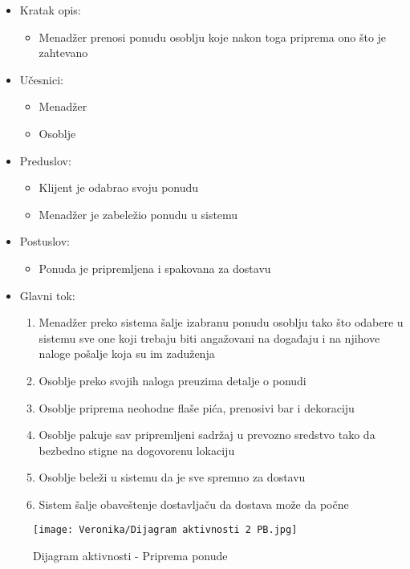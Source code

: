 \documentclass[a4paper]{article}
\begin{document}
\begin{itemize}
    \item Kratak opis:
        \begin{itemize}
            \item Menadžer prenosi ponudu osoblju koje nakon toga priprema ono što je zahtevano
        \end{itemize}
    \item Učesnici:
        \begin{itemize}
            \item Menadžer 
            \item Osoblje
        \end{itemize}
    \item Preduslov:
        \begin{itemize}
            \item Klijent je odabrao svoju ponudu
		    \item Menadžer je zabeležio ponudu u sistemu
        \end{itemize}
    \item Postuslov:
        \begin{itemize}
            \item Ponuda je pripremljena i spakovana za dostavu
        \end{itemize}
    \item Glavni tok:
        \begin{enumerate}
           \item Menadžer preko sistema šalje izabranu ponudu osoblju tako što odabere u sistemu sve one koji trebaju biti angažovani na događaju i na njihove naloge pošalje koja su im zaduženja
		   \item Osoblje preko svojih naloga preuzima detalje o ponudi
	       \item Osoblje priprema neohodne flaše pića, prenosivi bar i dekoraciju
	       \item Osoblje pakuje sav pripremljeni sadržaj u prevozno sredstvo tako da bezbedno stigne na dogovorenu lokaciju
	       \item Osoblje beleži u sistemu da je sve spremno za dostavu
	       \item Sistem šalje obaveštenje dostavljaču da dostava može da počne
        \end{enumerate}
\end{itemize}

\begin{figure}[H]
    \centering
    \texttt{[image: Veronika/Dijagram aktivnosti 2 PB.jpg]}
    \caption{Dijagram aktivnosti - Priprema ponude}
    \label{fig:PrenosiviBar}
\end{figure}
\end{document}
